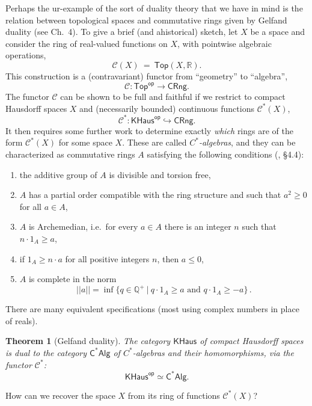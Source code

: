 \documentclass[12pt]{article}
\newtheorem*{theorem*}{Theorem}
\theoremstyle{remark}
\theoremstyle{definition}
\begin{document}
Perhaps the ur-example of the sort of duality theory that we have in mind is the relation between topological spaces and commutative rings given by Gelfand duality (see \cite{J} Ch.~4).  To give a brief (and ahistorical) sketch, let $X$ be a  space and consider the ring of real-valued functions on $X$, with pointwise algebraic operations,
\[
 \mathcal{C}(X)\ =\ \mathsf{Top}(X, \mathbb{R}).
 \]
 This construction is a (contravariant) functor from ``geometry'' to ``algebra'',
 \[
 \mathcal{C} : \mathsf{Top}^\mathsf{op} \to \mathsf{CRng}.
 \]
%
The functor $ \mathcal{C}$ can be shown  to be full and faithful if we restrict to compact Hausdorff spaces $X$ and (necessarily bounded) continuous functions  $\mathcal{C}^*(X)$,
 \[
 \mathcal{C}^* : \mathsf{KHaus}^\mathsf{op} \hookrightarrow \mathsf{CRng}.
 \]
It then requires some further work to determine exactly \emph{which} rings are of the form $\mathcal{C}^*(X)$ for some space $X$.   These are called \emph{$C^*$-algebras}, and they can be characterized as commutative rings $A$ satisfying the following conditions (\cite{J}, \S4.4):
\begin{enumerate}
\item the additive group of $A$ is divisible and torsion free,
\item $A$ has a partial order compatible with the ring structure and such that $a^2 \geq 0$ for all $a\in A$,
\item $A$ is Archemedian, i.e.\ for every  $a\in A$ there is an integer $n$ such that $n\cdot 1_A \geq a$,
\item if $1_A\geq n\cdot a$ for all positive integers $n$, then $a\leq 0$,
\item $A$ is complete in the norm $$||a|| = \inf\{ q\in \mathbb{Q}^+\ |\ q\cdot 1_A \geq a\text{ and } q\cdot 1_A \geq -a\}\,.$$
\end{enumerate}
There are many equivalent specifications (most using complex numbers in place of reals).

 \begin{theorem*}[Gelfand duality]
 The category $\mathsf{KHaus}$ of compact Hausdorff spaces is dual to the category $\mathsf{C^*Alg}$ of $C^*$-algebras and their homomorphisms, via the functor $\mathcal{C}^*$:
 \[
 \mathsf{KHaus}^\mathsf{op} \simeq \mathsf{C^*Alg}.
 \]
 \end{theorem*}

How can we  recover the space $X$ from its ring of functions $\mathcal{C}^*(X)$?
\end{document}
